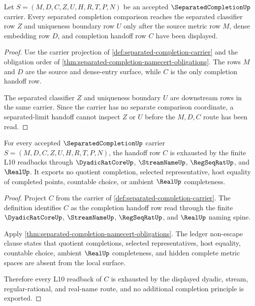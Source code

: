 \begin{theorem}
\label{thm:separated-completion-separated-limit-handoff}
Let $S=(M,D,C,Z,U,H,R,T,P,N)$ be an accepted $\SeparatedCompletionUp$ carrier. Every separated completion comparison reaches the separated classifier row $Z$ and uniqueness boundary row $U$ only after the source metric row $M$, dense embedding row $D$, and completion handoff row $C$ have been displayed.
\end{theorem}
\begin{proof}
Use the carrier projection of \autoref{def:separated-completion-carrier} and the obligation order of \autoref{thm:separated-completion-namecert-obligations}. The rows $M$ and $D$ are the source and dense-entry surface, while $C$ is the only completion handoff row.

The separated classifier $Z$ and uniqueness boundary $U$ are downstream rows in the same carrier. Since the carrier has no separate comparison coordinate, a separated-limit handoff cannot inspect $Z$ or $U$ before the $M,D,C$ route has been read.
\end{proof}

\begin{theorem}
\label{thm:separated-completion-l10-readback-exhaustion}
For every accepted $\SeparatedCompletionUp$ carrier $S=(M,D,C,Z,U,H,R,T,P,N)$, the handoff row $C$ is exhausted by the finite L10 readbacks through $\DyadicRatCoreUp$, $\StreamNameUp$, $\RegSeqRatUp$, and $\RealUp$. It exports no quotient completion, selected representative, host equality of completed points, countable choice, or ambient $\RealUp$ completeness.
\end{theorem}
\begin{proof}
Project $C$ from the carrier of \autoref{def:separated-completion-carrier}. The definition identifies $C$ as the completion handoff row read through the finite $\DyadicRatCoreUp$, $\StreamNameUp$, $\RegSeqRatUp$, and $\RealUp$ naming spine.

Apply \autoref{thm:separated-completion-namecert-obligations}. The ledger non-escape clause states that quotient completions, selected representatives, host equality, countable choice, ambient $\RealUp$ completeness, and hidden complete metric spaces are absent from the local surface.

Therefore every L10 readback of $C$ is exhausted by the displayed dyadic, stream, regular-rational, and real-name route, and no additional completion principle is exported.
\end{proof}

